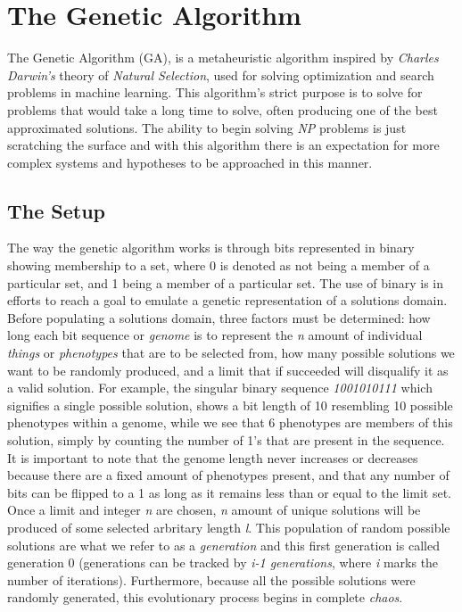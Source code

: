 \section{The Genetic Algorithm}
\label{sec: the genetic algorithm}

The Genetic Algorithm (GA), is a metaheuristic algorithm inspired by \emph{Charles Darwin's} theory of \emph{Natural Selection}, used for solving optimization and search problems in machine learning. This algorithm's strict purpose is to solve for problems that would take a long time to solve, often producing one of the best approximated solutions. The ability to begin solving \emph{NP} problems is just scratching the surface and with this algorithm there is an expectation for more complex systems and hypotheses to be approached in this manner.

\subsection{The Setup}
\label{setup} 

The way the genetic algorithm works is through bits represented in binary showing membership to a set, where 0 is denoted as not being a member of a particular set, and 1 being a member of a particular set. The use of binary is in efforts to reach a goal to emulate a genetic representation of a solutions domain. 
Before populating a solutions domain, three factors must be determined: how long each bit sequence or \emph{genome} is to represent the \emph{n}  amount of individual \emph{things} or \emph{phenotypes} that are to be selected from, how many possible solutions we want to be randomly produced, and a limit that if succeeded will disqualify it as a valid solution. For example, the singular binary sequence \emph{1001010111} which signifies a single possible solution, shows a bit length of 10 resembling 10 possible phenotypes within a genome, while we see that 6 phenotypes are members of this solution, simply by counting the number of 1's that are present in the sequence. It is important to note that the genome length never increases or decreases because there are a fixed amount of phenotypes present, and that any number of bits can be flipped to a 1 as long as it remains less than or equal to the limit set. Once a limit and integer \emph{n} are chosen, \emph{n} amount of unique solutions will be produced of some selected arbritary length \emph{l}. This population of random possible solutions are what we refer to as a \emph{generation} and this first generation is called generation 0 (generations can be tracked by \emph{i-1 generations}, where \emph{i} marks the number of iterations). Furthermore, because all the possible solutions were randomly generated, this evolutionary process begins in complete \emph{chaos}.

